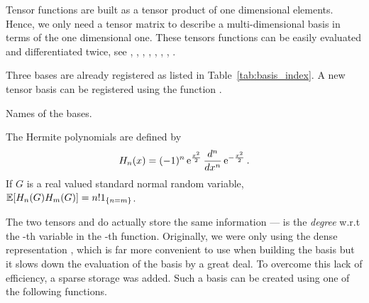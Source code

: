 Tensor functions are built as a tensor product of one dimensional elements. Hence, we only need a tensor matrix  to describe a multi-dimensional basis in terms of the one dimensional one. These tensors functions can be easily evaluated and differentiated twice, see ,
, , ,
, ,
, .

Three bases are already registered as listed in Table~\ref{tab:basis_index}. A new tensor basis can be registered using the function
  .

\begin{table}[h!]
  \begin{describeconst}
  \end{describeconst}
  \caption{Names of the bases.}
  \label{tab:basis_index}
\end{table}

The Hermite polynomials are defined by
\begin{equation*}
  H_n(x) = (-1)^n \operatorname{e}^{ \frac{x^2}{2} } \frac{d^n}{dx^n} \operatorname{e}^{ -\frac{x^2}{2} }.
\end{equation*}
If $G$ is a real valued standard normal random variable, ${\mathbb E}[H_n(G) H_m(G)] = n!  1_{\left\{n = m\right\}}$.


The two tensors  and  do actually store the same information ---  is the \emph{degree} w.r.t the -th variable in the -th function. Originally, we were only using the dense representation , which is far more convenient to use when building the basis but it slows down the evaluation of the basis by a great deal. To overcome this lack of efficiency, a sparse storage was added. Such a basis can be created using one of the following functions.

